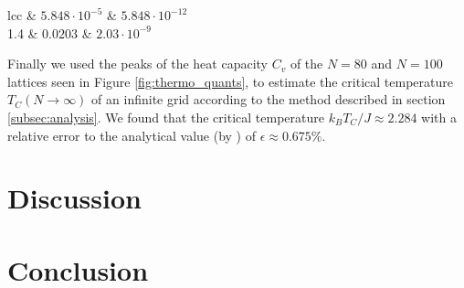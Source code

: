 \documentclass[twocolumn]{aastex62}
\begin{document}
\begin{deluxetable}{lcc}
	 & $5.848\cdot 10^{-5}$ & $5.848\cdot 10^{-12}$ \\
	1.4 & $0.0203$ & $2.03\cdot 10^{-9}$	
	\enddata
\end{deluxetable}
Finally we used the peaks of the heat capacity $C_v$ of the $N = 80$ and $N =
100$ lattices seen in Figure \ref{fig:thermo_quants}, to estimate the critical
temperature $T_C(N\to\infty)$ of an infinite grid according to the method
described in section \ref{subsec:analysis}. We found that the critical
temperature $k_BT_C / J \approx 2.284$ with a relative error to the
analytical value (by \cite{onsager:1944}) of $\epsilon \approx 0.675\%$.

\section{Discussion} \label{sec:discussion}

\section{Conclusion} \label{sec:conclusion}




\end{document}

